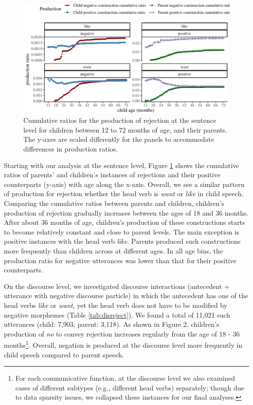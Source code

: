 \documentclass[
  english,
  man,floatsintext]{apa6}
\begin{document}
\begin{figure}[H]

{\centering \includegraphics{neg_construction_article_files/figure-latex/emotion-1} 

}

\caption{Cumulative ratios for the production of rejection at the sentence level for children between 12 to 72 months of age, and their parents. The y-axes are scaled differently for the panels to accommodate differences in production ratios.}\label{fig:emotion}
\end{figure}

Starting with our analysis at the sentence level, Figure \ref{fig:emotion} shows the cumulative ratios of parents' and children's instances of rejections and their positive counterparts (y-axis) with age along the x-axis. Overall, we see a similar pattern of production for rejection whether the head verb is \emph{want} or \emph{like} in child speech. Comparing the cumulative ratios between parents and children, children's production of rejection gradually increases between the ages of 18 and 36 months. After about 36 months of age, children's production of these constructions starts to become relatively constant and close to parent levels. The main exception is positive instances with the head verb \emph{like}. Parents produced such constructions more frequently than children across at different ages. In all age bins, the production ratio for negative utterances was lower than that for their positive counterparts.

On the discourse level, we investigated discourse interactions (antecedent + utterance with negative discourse particle) in which the antecedent has one of the head verbs \emph{like} or \emph{want}, yet the head verb does not have to be modified by negative morphemes (Table \ref{tab:disreject}). We found a total of 11,021 such utterances (child: 7,903; parent: 3,118). As shown in Figure 2, children's production of \emph{no} to convey rejection increases regularly from the age of 18 - 36 months\footnote{For each communicative function, at the discourse level we also examined cases of different subtypes (e.g., different head verbs) separately; though due to data sparsity issues, we collapsed these instances for our final analyses.}. Overall, negation is produced at the discourse level more frequently in child speech compared to parent speech.
\end{document}
